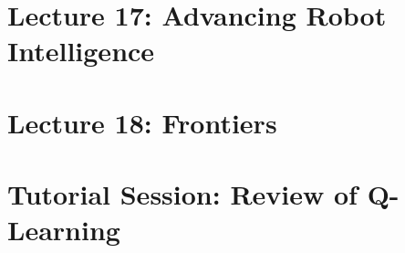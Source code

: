 \documentclass[a4paper]{article}
\begin{document}
\section{Lecture 17: Advancing Robot Intelligence}


\section{Lecture 18: Frontiers}


\section{Tutorial Session: Review of Q-Learning}

\end{document}
